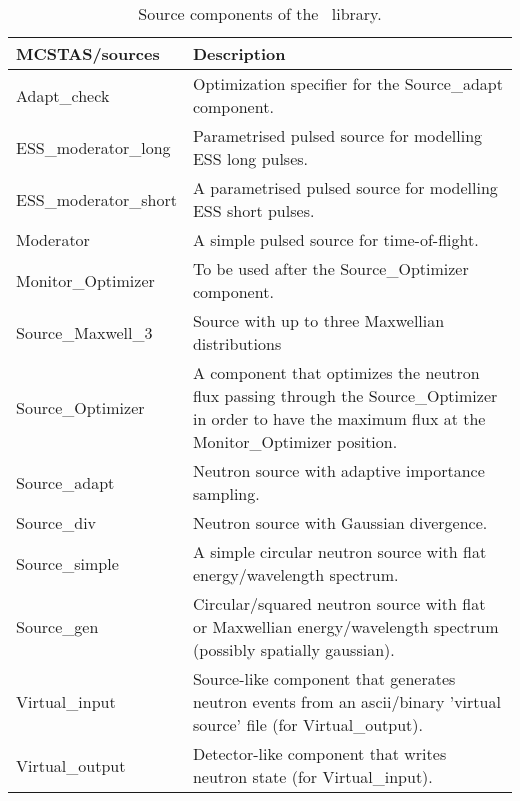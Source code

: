 \begin{table}
  \begin{center}
    {\let\my=\\
    \begin{tabular}{|p{}|p{}|}
      \hline
       {\bf MCSTAS/sources} & Description \\
       \hline
Adapt\_check & Optimization specifier for the Source\_adapt component. \\
ESS\_moderator\_long & Parametrised pulsed source for modelling ESS long pulses. \\
ESS\_moderator\_short & A parametrised pulsed source for modelling ESS short pulses. \\
Moderator  & A simple pulsed source for time-of-flight. \\
Monitor\_Optimizer &  To be used after the Source\_Optimizer component. \\
Source\_Maxwell\_3 & Source with up to three Maxwellian distributions \\
Source\_Optimizer & A component that optimizes the neutron flux passing through the Source\_Optimizer in order to have the maximum flux at the Monitor\_Optimizer position. \\
Source\_adapt  &       Neutron source with adaptive importance sampling. \\
Source\_div &          Neutron source with Gaussian divergence. \\
Source\_simple &  A simple circular neutron source with flat energy/wavelength spectrum.\\
Source\_gen     &    Circular/squared neutron source with flat or Maxwellian
                      energy/wavelength spectrum (possibly spatially
                      gaussian). \\
Virtual\_input &  Source-like component that generates neutron events from an ascii/binary 'virtual source' file (for Virtual\_output). \\
Virtual\_output &  Detector-like component that writes neutron state (for Virtual\_input). \\
      \hline
    \end{tabular}
    \caption{Source components of the \MCS\ library.}
    \label{t:comp-sources}
    }
  \end{center}
\end{table}


